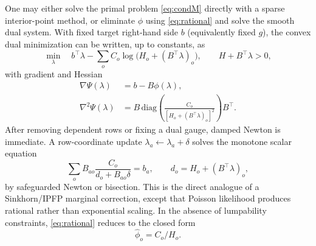 \documentclass[10pt]{article}
\begin{document}
One may either solve the primal problem \eqref{eq:condM} directly with a sparse interior-point method, or eliminate $\phi$ using \eqref{eq:rational} and solve the smooth dual system.  With fixed target right-hand side $b$ (equivalently fixed $g$), the convex dual minimization can be written, up to constants, as
\begin{equation}\label{eq:dual}
\min_\lambda\quad b^\top\lambda-\sum_oC_o\log\bigl(H_o+(B^\top\lambda)_o\bigr),
\qquad H+B^\top\lambda>0,
\end{equation}
with gradient and Hessian
\begin{align}
\nabla\Psi(\lambda)&=b-B\phi(\lambda),\\
\nabla^2\Psi(\lambda)&=B\,\mathrm{diag}\!\left(\frac{C_o}{[H_o+(B^\top\lambda)_o]^2}\right)B^\top.
\end{align}
After removing dependent rows or fixing a dual gauge, damped Newton is immediate.  A row-coordinate update $\lambda_a\leftarrow\lambda_a+\delta$ solves the monotone scalar equation
\begin{equation}\label{eq:coord}
\sum_oB_{ao}\frac{C_o}{d_o+B_{ao}\delta}=b_a,
\qquad d_o=H_o+(B^\top\lambda)_o,
\end{equation}
by safeguarded Newton or bisection.  This is the direct analogue of a Sinkhorn/IPFP marginal correction, except that Poisson likelihood produces rational rather than exponential scaling.  In the absence of lumpability constraints, \eqref{eq:rational} reduces to the closed form
\begin{equation}
\widehat\phi_o=C_o/H_o.
\end{equation}
\end{document}
